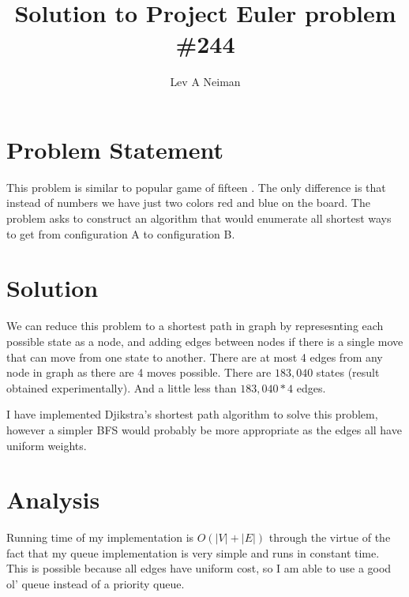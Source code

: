 \documentclass[11pt]{article}
\begin{document}
\title{Solution to Project Euler problem \#244}
\author{Lev A Neiman}

\maketitle

\section{Problem Statement}

This problem is similar to popular game of fifteen \cite{fifteen}.  The only difference is that instead of numbers we have just two colors red and blue on the board.  The problem asks to construct an algorithm that would enumerate all shortest ways to get from configuration A to configuration B.

\section{Solution}

We can reduce this problem to a shortest path in graph by represesnting each possible state as a node, and adding edges between nodes if there is a single move that can move from one state to another.  There are at most 4 edges from any node in graph as there are 4 moves possible.  There are $ 183,040 $ states (result obtained experimentally).  And a little less than $ 183,040*4 $ edges.

I have implemented Djikstra's shortest path algorithm \cite{dijkstra} to solve this problem, however a simpler BFS would probably be more appropriate as the edges all have uniform weights.  

\section{Analysis}

Running time of my implementation is $ O(|V|+|E|) $ through the virtue of the fact that my queue implementation is very simple and runs in constant time.  This is possible because all edges have uniform cost, so I am able to use a good ol' queue instead of a priority queue.  



\end{document}

